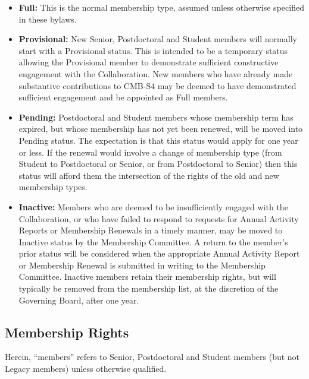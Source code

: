 \documentclass[12pt]{article}
\begin{document}
\begin{itemize}

\item {\bf Full:}
This is the normal membership type, assumed unless otherwise specified in these bylaws.

\item {\bf Provisional:} 
New Senior, Postdoctoral and Student members will normally start with a Provisional status. This is intended to be a temporary status allowing the Provisional member to demonstrate sufficient constructive engagement with the Collaboration. New members who have already made substantive contributions to CMB-S4 may be deemed to have demonstrated sufficient engagement and be appointed as Full members. 

\item {\bf Pending:} 
Postdoctoral and Student members whose membership term has expired, but whose membership has not yet been renewed, will be moved into Pending status. 
The expectation is that this status would apply for one year or less. 
If the renewal would involve a change of membership type (from Student to Postdoctoral or Senior, or from Postdoctoral to Senior) then this status will afford them the intersection of the rights of the old and new membership types.

\item {\bf Inactive:}
Members who are deemed to be insufficiently engaged with the Collaboration, or who have failed to respond to requests for Annual Activity Reports or Membership Renewals in a timely manner, may be moved to Inactive status by the Membership Committee. A return to the member's prior status will be considered when the appropriate Annual Activity Report or Membership Renewal is submitted in writing to the Membership Committee. Inactive members retain their membership rights, but will typically be removed from the membership list, at the discretion of the Governing Board, after one year.

\end{itemize}

\subsection{Membership Rights}\label{sec:memberrights}

Herein, ``members'' refers to Senior, Postdoctoral and Student members (but not Legacy members) unless otherwise qualified.  
\end{document}
